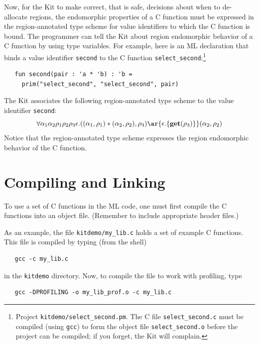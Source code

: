 \documentclass[12pt]{book}
\begin{document}
Now, for the Kit to make correct, that is safe, decisions about when
to de-allocate regions, the endomorphic properties of a C function
must be expressed in the region-annotated type scheme for value identifiers
to which the C function is bound. The programmer can tell the Kit
about region endomorphic behavior of a C function by using type
variables.  For example, here is an ML declaration that binds a value
identifier {\tt second} to the C function
\verb|select_second|:\footnote{Project {\tt kitdemo/select\_second.pm}. The C
  file {\tt select\_second.c} must be compiled (using {\tt gcc}) to
  form the object file {\tt select\_second.o} before the project can
  be compiled; if you forget, the Kit will complain.}
\begin{verbatim}
   fun second(pair : 'a * 'b) : 'b =
     prim("select_second", "select_second", pair)
\end{verbatim}
The Kit associates the following region-annotated type scheme to the value
identifier {\tt second}:
$$\forall \alpha_1\alpha_2\rho_1\rho_2\rho_3\epsilon.((\alpha_1,
\rho_1) * (\alpha_2, \rho_2), \rho_3) \ar{\epsilon.\{\Get(\rho_3)\}} (\alpha_2,
\rho_2)$$
Notice that the region-annotated type scheme expresses the region endomorphic
behavior of the C function.

 
\section{Compiling and Linking}
\label{comp_and_link_with_C.sec}
To use a set of C functions in the ML code, one must first compile the
C functions into an object file. (Remember to include appropriate
header files.)

As an example, the file \verb|kitdemo/my_lib.c| holds a set of example
C functions. This file is compiled by typing (from the shell)
\begin{verbatim}
   gcc -c my_lib.c
\end{verbatim}
in the {\tt kitdemo} directory. Now, to compile the file to work with
profiling, type
\begin{verbatim}
   gcc -DPROFILING -o my_lib_prof.o -c my_lib.c
\end{verbatim}
\end{document}
